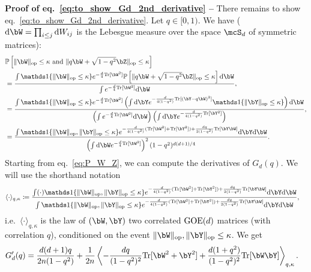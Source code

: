 \myskip
\textbf{Proof of eq.~\eqref{eq:to_show_Gd_2nd_derivative} --}
There remains to show eq.~\eqref{eq:to_show_Gd_2nd_derivative}.
Let $q \in [0,1)$.
We have ($\rd \bW = \prod_{i \leq j} \rd W_{ij}$ is the Lebesgue measure over the space $\mcS_{d}$ of symmetric matrices):
\begin{align}
    \label{eq:P_W_Z}
    \nonumber
    &\bbP\left[\|\bW\|_\op \leq \kappa \textrm{ and } \|q \bW + \sqrt{1-q^2} \bZ\|_\op \leq \kappa\right] \\ 
    \nonumber
    &= \frac{\int \indi\{\|\bW\|_\op \leq \kappa\} e^{-\frac{d}{4} \Tr[\bW^2]} \bbP\left[\|q \bW + \sqrt{1-q^2} \bZ\|_\op \leq \kappa\right] \rd \bW}{\int  e^{-\frac{d}{4} \Tr[\bW^2]} \rd \bW}, \\
    \nonumber
    &= \frac{\int \indi\{\|\bW\|_\op \leq \kappa\} e^{-\frac{d}{4} \Tr[\bW^2]} \left(\int \rd \bY e^{-\frac{d}{4(1-q^2)}\Tr[(\bY - q \bW)^2]} \indi\{\|\bY\|_\op \leq \kappa\}\right) \rd \bW}{\left(\int  e^{-\frac{d}{4} \Tr[\bW^2]} \rd \bW\right) \left(\int \rd \bY e^{-\frac{d}{4(1-q^2)}\Tr[\bY^2]}\right)}, \\
    &= \frac{\int \indi\{\|\bW\|_\op, \|\bY\|_\op \leq \kappa\} e^{-\frac{d}{4(1-q^2)} (\Tr[\bW^2] + \Tr[\bY^2]) + \frac{dq}{2(1-q^2)} \Tr[\bY \bW]} \rd \bY \rd \bW}{\left(\int \rd \bW e^{-\frac{d}{4}\Tr[\bW^2]}\right)^2 (1-q^2)^{d(d+1)/4}}.
\end{align}
Starting from eq.~\eqref{eq:P_W_Z}, we can compute the derivatives of $G_d(q)$.
We will use the shorthand notation 
\begin{align}
    \label{eq:gibbs_q}
    \langle \cdot \rangle_{q,\kappa} &\coloneqq \frac{\int (\cdot) \indi\{\|\bW\|_\op, \|\bY\|_\op \leq \kappa\} e^{-\frac{d}{4(1-q^2)} (\Tr[\bW^2] + \Tr[\bY^2]) + \frac{dq}{2(1-q^2)} \Tr[\bY \bW]} \rd \bY \rd \bW}{\int \indi\{\|\bW\|_\op, \|\bY\|_\op \leq \kappa\} e^{-\frac{d}{4(1-q^2)} (\Tr[\bW^2] + \Tr[\bY^2]) + \frac{dq}{2(1-q^2)} \Tr[\bY \bW]} \rd \bY \rd \bW},
\end{align}
i.e.\ $\langle \cdot \rangle_{q,\kappa}$ is the law of $(\bW, \bY)$ two correlated $\mathrm{GOE}(d)$ matrices (with correlation $q$), conditioned on the event $\|\bW\|_\op, \|\bY\|_\op \leq \kappa$.
We get
\begin{align*}
    G_d'(q) &= \frac{d(d+1) q}{2n (1-q^2)} + \frac{1}{2n} \left\langle -\frac{dq}{(1-q^2)^2} \Tr[\bW^2+\bY^2] 
    + \frac{d(1+q^2)}{(1-q^2)^2} \Tr[\bW\bY]
    \right\rangle_{q,\kappa}.
\end{align*}
